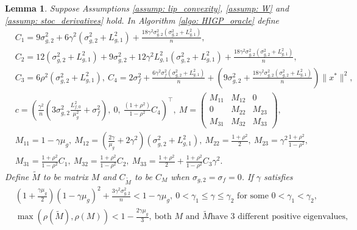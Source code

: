 \documentclass{article}
\theoremstyle{plain}
\newtheorem{lemma}[theorem]{Lemma}
\theoremstyle{definition}
\theoremstyle{remark}
\newcommand{\T}{^{\top}}
\begin{document}
\begin{lemma}\label{lem: dsgd_higp}
    Suppose Assumptions \ref{assump: lip_convexity}, \ref{assump: W} and \ref{assump: stoc_derivatives} hold. In Algorithm \ref{algo: HIGP_oracle} define
    \begin{align*}
        &C_1 = 9\sigma_{g,2}^2 + 6\gamma^2(\sigma_{g,2}^2 + L_{g,1}^2) + \frac{18\gamma^2\sigma_{g,2}^2(\sigma_{g,2}^2 + L_{g,1}^2)}{n},\\
        &C_2 = 12(\sigma_{g,2}^2 + L_{g,1}^2) + 9\sigma_{g,2}^2 + 12\gamma^2L_{g,1}^2(\sigma_{g,2}^2 + L_{g,1}^2)  + \frac{18\gamma^2\sigma_{g,2}^2(\sigma_{g,2}^2 + L_{g,1}^2)}{n}, \\
        &C_3 = 6\rho^2(\sigma_{g,2}^2 + L_{g,1}^2),\ C_4 = 2\sigma_{f}^2 + \frac{6\gamma^2\sigma_{f}^2(\sigma_{g,2}^2 + L_{g,1}^2)}{n} + (9\sigma_{g,2}^2 + \frac{18\gamma^2\sigma_{g,2}^2(\sigma_{g,2}^2 + L_{g,1}^2)}{n})\|x^*\|^2, \\
        &c = \left(\frac{\gamma^2}{n}\left(3\sigma_{g,2}^2\frac{L_{f,0}^2}{\mu_g^2} + \sigma_f^2\right),\ 0,\ \frac{(1+\rho^2)}{1-\rho^2}C_4\right)\T,\ M = 
        \begin{pmatrix}
            M_{11} &M_{12} &0 \\
            0 &M_{22} &M_{23} \\
            M_{31} &M_{32} &M_{33}
        \end{pmatrix}, \\
        & M_{11} = 1-\gamma\mu_g,\ M_{12} = \left(\frac{2\gamma}{\mu_g} + 2\gamma^2\right)(\sigma_{g,2}^2 + L_{g,1}^2),\ M_{22} = \frac{1+\rho^2}{2},\ M_{23} = \gamma^2\frac{1+\rho^2}{1-\rho^2}, \\
        &M_{31} = \frac{1+\rho^2}{1-\rho^2}C_1,\ M_{32} = \frac{1+\rho^2}{1-\rho^2}C_2,\ M_{33} = \frac{1+\rho^2}{2} + \frac{1+\rho^2}{1-\rho^2}C_3\gamma^2.
    \end{align*}
    Define $\tilde{M}$ to be matrix $M$ and $C_{\tilde{M}}$ to be $C_{M}$ when $\sigma_{g,2} = \sigma_{f} = 0$. If $\gamma$ satisfies
    \begin{equation}\label{ineq: gamma_for_quadratics}
        \begin{aligned}
            &\left(1+\frac{\gamma\mu_g}{2}\right)(1-\gamma\mu_g)^2 + \frac{3\gamma^2\sigma_{g,2}^2}{n}<1-\gamma\mu_g,\ 0< \gamma_1\leq \gamma \leq \gamma_2 \text{ for some } 0<\gamma_1<\gamma_2, \\
            &\max\left(\rho(\tilde{M}), \rho(M)\right) < 1 - \frac{2\gamma\mu_g}{3},\  \text{both } M \text{ and } \tilde{M} \text{have 3 different positive eigenvalues,}  

\end{aligned}
\end{equation}
\end{lemma}
\end{document}
